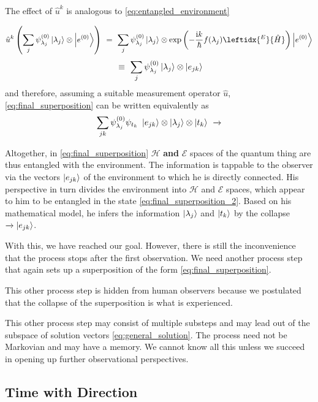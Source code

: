 \documentclass[12pt]{article}
\begin{document}
The effect of $\hat{u}^k$ is analogous to \eqref{eq:entangled_environment}

\begin{equation*}
\hat{u}^k\left(\sum_j \psi^{(0)}_{\lambda_j} \ket{\lambda_j}\otimes\ket{e^{(0)}}\right)
\ =\ \sum_j \psi^{(0)}_{\lambda_j} \ket{\lambda_j} 
\otimes \mathrm{exp}\left(-\frac{\mathrm{i}k}{\hbar}f(\lambda_j)\leftidx{^E}{\hat{H}}\right)
\ket{e^{(0)}} 
\end{equation*}
\begin{equation}
\label{eq:entangled_environment_new}
\ \equiv\ 
\sum_j \psi^{(0)}_{\lambda_j} \ket{\lambda_j} 
\otimes \ket{e_{jk}} 
\end{equation}
and therefore, assuming a suitable measurement operator $\hat{u}$, \eqref{eq:final_superposition} can be written equivalently as
\begin{equation}
\label{eq:final_superposition_2}
\sum_{jk} \psi_{\lambda_j}^{(0)}\psi_{t_k}\ \ket{e_{jk}} \otimes \ket{\lambda_j} \otimes \ket{t_k}
\ \xrightarrow{}
\end{equation}

Altogether, in \eqref{eq:final_superposition} $\mathscr{H}$ \textbf{and} $\mathscr{E}$ spaces of the quantum thing are thus entangled with the environment. The information is tappable to the observer via the vectors $\ket{e_{jk}}$ of the environment to which he is directly connected. His perspective in turn divides the environment into $\mathscr{H}$ and $\mathscr{E}$ spaces, which appear to him to be entangled in the state \eqref{eq:final_superposition_2}. Based on his mathematical model, he infers the information $\ket{\lambda_j}$ and $\ket{t_k}$ by the collapse $\xrightarrow{}\ket{e_{jk}}$.

With this, we have reached our goal. However, there is still the inconvenience that the process stops after the first observation. We need another process step that again sets up a superposition of the form \eqref{eq:final_superposition}. 

This other process step is hidden from human observers because we postulated that the collapse of the superposition is what is experienced. 

This other process step may consist of multiple substeps and may lead out of the subspace of solution vectors \eqref{eq:general_solution}. The process need not be Markovian and may have a memory. We cannot know all this unless we succeed in opening up further observational perspectives. 

\subsection{Time with Direction}
\end{document}
